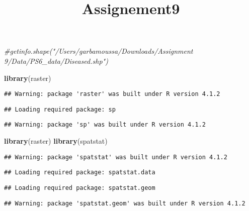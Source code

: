 \documentclass[]{article}
\title{Assignement9}
\author{}
\date{\vspace{-2.5em}}
\newenvironment{Shaded}{\begin{snugshade}}{\end{snugshade}}
\newcommand{\CommentTok}[1]{\textcolor[rgb]{0.56,0.35,0.01}{\textit{#1}}}
\newcommand{\KeywordTok}[1]{\textcolor[rgb]{0.13,0.29,0.53}{\textbf{#1}}}
\newcommand{\NormalTok}[1]{#1}
\begin{document}
\maketitle

\hypertarget{section}{%
\subsection{}\label{section}}

\begin{Shaded}
\begin{Highlighting}[]
\CommentTok{#getinfo.shape("/Users/garbamoussa/Downloads/Assignment 9/Data/PS6_data/Diseased.shp")}

\KeywordTok{library}\NormalTok{(raster)}
\end{Highlighting}
\end{Shaded}

\begin{verbatim}
## Warning: package 'raster' was built under R version 4.1.2
\end{verbatim}

\begin{verbatim}
## Loading required package: sp
\end{verbatim}

\begin{verbatim}
## Warning: package 'sp' was built under R version 4.1.2
\end{verbatim}

\begin{Shaded}
\begin{Highlighting}[]
\KeywordTok{library}\NormalTok{(raster)}
\KeywordTok{library}\NormalTok{(spatstat)}
\end{Highlighting}
\end{Shaded}

\begin{verbatim}
## Warning: package 'spatstat' was built under R version 4.1.2
\end{verbatim}

\begin{verbatim}
## Loading required package: spatstat.data
\end{verbatim}

\begin{verbatim}
## Loading required package: spatstat.geom
\end{verbatim}

\begin{verbatim}
## Warning: package 'spatstat.geom' was built under R version 4.1.2
\end{verbatim}
\end{document}
